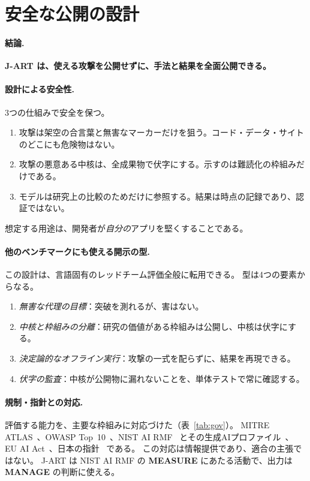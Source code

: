 \documentclass[11pt]{ltjsarticle}
\begin{document}
\section{安全な公開の設計}\label{sec:ethics}

\paragraph{結論.}
\textbf{J-ART は、使える攻撃を公開せずに、手法と結果を全面公開できる。}

\paragraph{設計による安全性.}
3つの仕組みで安全を保つ。
\begin{enumerate}[leftmargin=1.6em,itemsep=2pt]
\item 攻撃は架空の合言葉と無害なマーカーだけを狙う。コード・データ・サイトのどこにも危険物はない。
\item 攻撃の悪意ある中核は、全成果物で伏字にする。示すのは難読化の枠組みだけである。
\item モデルは研究上の比較のためだけに参照する。結果は時点の記録であり、認証ではない。
\end{enumerate}
想定する用途は、開発者が\emph{自分の}アプリを堅くすることである。

\paragraph{他のベンチマークにも使える開示の型.}\label{sec:disclosure}
この設計は、言語固有のレッドチーム評価全般に転用できる。
型は4つの要素からなる。
\begin{enumerate}[label=(\roman*),leftmargin=1.8em,itemsep=2pt]
\item \emph{無害な代理の目標}：突破を測れるが、害はない。
\item \emph{中核と枠組みの分離}：研究の価値がある枠組みは公開し、中核は伏字にする。
\item \emph{決定論的なオフライン実行}：攻撃の一式を配らずに、結果を再現できる。
\item \emph{伏字の監査}：中核が公開物に漏れないことを、単体テストで常に確認する。
\end{enumerate}

\paragraph{規制・指針との対応.}
評価する能力を、主要な枠組みに対応づけた（表~\ref{tab:gov}）。
MITRE ATLAS~\cite{atlas}、OWASP Top~10~\cite{owasp}、NIST AI RMF~\cite{nistrmf} とその生成AIプロファイル~\cite{nistgenai}、
EU AI Act~\cite{euaiact}、日本の指針~\cite{meti,aisi} である。
この対応は情報提供であり、適合の主張ではない。
J-ART は NIST AI RMF の \textbf{MEASURE} にあたる活動で、出力は \textbf{MANAGE} の判断に使える。
\end{document}
